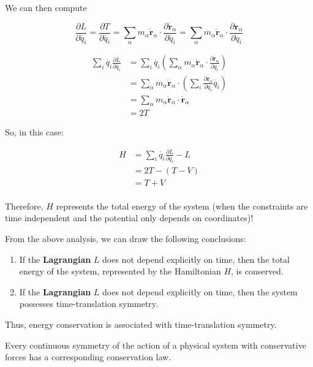 We can then compute

\begin{equation}
    \frac{\partial L}{\partial \dot{q_i}} = \frac{\partial T}{\partial \dot{q_i}} = \sum_\alpha m_\alpha \dot{\mathbf{r}}_\alpha \cdot \frac{\partial \dot{\mathbf{r}}_\alpha}{\partial \dot{q_i}} = \sum_\alpha m_\alpha \dot{\mathbf{r}}_\alpha \cdot \frac{\partial \mathbf{r}_\alpha}{\partial q_i}
\end{equation}

\begin{align}
    \sum_i \dot{q_i} \frac{\partial L}{\partial \dot{q_i}} &= \sum_i \dot{q_i} \left(\sum_\alpha m_\alpha \dot{\mathbf{r}}_\alpha \cdot \frac{\partial \mathbf{r}_\alpha}{\partial q_i}\right) \\
    &= \sum_\alpha m_\alpha \dot{\mathbf{r}}_\alpha \cdot \left(\sum_i \frac{\partial \mathbf{r}_\alpha}{\partial q_i} \dot{q_i}\right) \\
    &= \sum_\alpha m_\alpha \dot{\mathbf{r}}_\alpha \cdot \dot{\mathbf{r}}_\alpha \\
    &= 2T
\end{align}

So, in this case:

\begin{align}
    H &= \sum_i \dot{q_i} \frac{\partial L}{\partial \dot{q_i}} - L \\
    &= 2T - \left(T - V\right) \\
    &= T + V \\
\end{align}

Therefore, $H$ represents the total energy of the system (when the constraints are time independent and the potential only depends on coordinates)!

From the above analysis, we can draw the following conclusions:

\begin{enumerate}
    \item If the \textbf{Lagrangian} $L$ does not depend explicitly on time, then the total energy of the system, represented by the Hamiltonian $H$, is conserved.
    \item If the \textbf{Lagrangian} $L$ does not depend explicitly on time, then the system possesses time-translation symmetry.
\end{enumerate}

Thus, energy conservation is associated with time-translation symmetry.

\begin{definition}
 Every continuous symmetry of the action of a physical system with conservative forces has a corresponding conservation law.
\end{definition}

